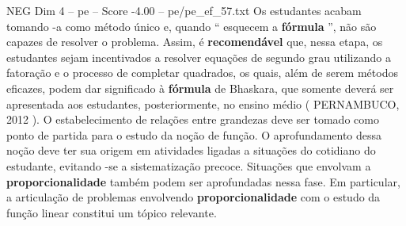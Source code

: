 \begin{textsample}{NEG Dim 4 – pe – Score -4.00 – pe/pe\_ef\_57.txt}
Os estudantes acabam tomando -a como método único e, quando “ esquecem a \textbf{fórmula} ”, não são capazes de resolver o problema.
Assim, é \textbf{recomendável} que, nessa etapa, os estudantes sejam incentivados a resolver equações de segundo grau utilizando a fatoração e o processo de completar quadrados, os quais, além de serem métodos eficazes, podem dar significado à \textbf{fórmula} de Bhaskara, que somente deverá ser apresentada aos estudantes, posteriormente, no ensino médio ( PERNAMBUCO, 2012 ).
O estabelecimento de relações entre grandezas deve ser tomado como ponto de partida para o estudo da noção de função.
O aprofundamento dessa noção deve ter sua origem em atividades ligadas a situações do cotidiano do estudante, evitando -se a sistematização precoce.
Situações que envolvam a \textbf{proporcionalidade} também podem ser aprofundadas nessa fase.
Em particular, a articulação de problemas envolvendo \textbf{proporcionalidade} com o estudo da função linear constitui um tópico relevante.

\end{textsample}
